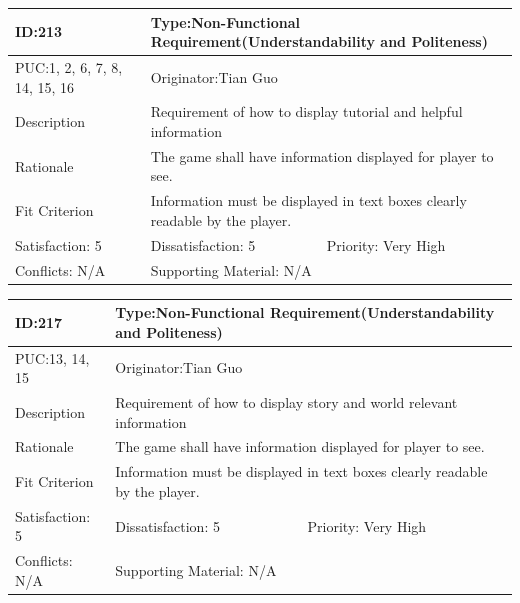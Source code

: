 \documentclass{article}
\begin{document}
	\begin{table}[H]
		\begin{tabular}{|l|l|l|}
			\hline
			ID:213 & \multicolumn{2}{l|}{Type:Non-Functional Requirement(Understandability and Politeness)} \\ \hline
			PUC:1, 2, 6, 7, 8, 14, 15, 16 & \multicolumn{2}{l|}{Originator:Tian Guo} \\ \hline
			Description & \multicolumn{2}{m{0.85\textwidth}|}{Requirement of how to display tutorial and helpful information} \\ \hline
			Rationale & \multicolumn{2}{m{0.85\textwidth}|}{The game shall have information displayed for player to see.} \\ \hline
			Fit Criterion & \multicolumn{2}{m{0.85\textwidth}|}{Information must be displayed in text boxes clearly readable by the player.} \\ \hline
			Satisfaction: 5 & Dissatisfaction: 5 & Priority: Very High \\ \hline
			Conflicts: N/A & \multicolumn{2}{l|}{Supporting Material: N/A} \\ \hline
		\end{tabular}
	\end{table}

	\begin{table}[H]
		\begin{tabular}{|l|l|l|}
			\hline
			ID:217 & \multicolumn{2}{l|}{Type:Non-Functional Requirement(Understandability and Politeness)} \\ \hline
			PUC:13, 14, 15 & \multicolumn{2}{l|}{Originator:Tian Guo} \\ \hline
			Description & \multicolumn{2}{m{0.85\textwidth}|}{Requirement of how to display story and world relevant information} \\ \hline
			Rationale & \multicolumn{2}{m{0.85\textwidth}|}{The game shall have information displayed for player to see.} \\ \hline
			Fit Criterion & \multicolumn{2}{m{0.85\textwidth}|}{Information must be displayed in text boxes clearly readable by the player.} \\ \hline
			Satisfaction: 5 & Dissatisfaction: 5 & Priority: Very High \\ \hline
			Conflicts: N/A & \multicolumn{2}{l|}{Supporting Material: N/A} \\ \hline
		\end{tabular}
	\end{table}
\end{document}
